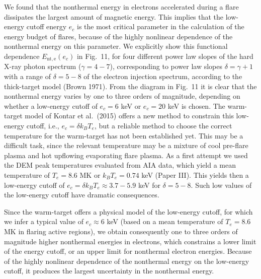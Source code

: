 \documentclass[10pt,preprint]{aastex}  %
\begin{document}
We found that the nonthermal energy in electrons accelerated during
a flare dissipates the largest amount of magnetic energy. This implies
that the low-energy cutoff energy $e_c$ is the most critical parameter
in the calculation of the energy budget of flares, because of the 
highly nonlinear dependence of the nonthermal energy on this
parameter. We explicitly show this functional dependence 
$E_{\mathrm{nt,e}}(e_c)$ in Fig.~11, for four different power law slopes
of the hard X-ray photon spectrum ($\gamma =4-7$), corresponding
to power law slopes $\delta=\gamma + 1$ with a range of 
$\delta = 5-8$ of the electron injection
spectrum, according to the thick-target model (Brown 1971).
From the diagram in Fig.~11 it is clear that the nonthermal energy 
varies by one to three orders of magnitude, depending on whether a 
low-energy cutoff of $e_c=6$ keV or $e_c=20$ keV is chosen.
The warm-target model of Kontar et al.~(2015) offers a new method
to constrain this low-energy cutoff, i.e., $e_c = \delta k_B T_e$,
but a reliable method to choose the correct temperature for the
warm-target has not been established yet. This may be a difficult
task, since the relevant temperature may be a mixture of cool
pre-flare plasma and hot upflowing evaporating flare plasma.
As a first attempt we used the DEM peak temperatures evaluated
from AIA data, which yield a mean temperature of $T_e=8.6$ MK
or $k_B T_e = 0.74$ keV (Paper III). This yields then a low-energy
cutoff of $e_c = \delta k_B T_e \approx 3.7-5.9$ keV for
$\delta = 5-8$. Such low values of the low-energy cutoff
have dramatic consequences.

Since the warm-target offers a physical model of the low-energy cutoff,
for which we infer a typical value of $e_c \approx
6$ keV (based on a mean temperature of $T_e=8.6$ MK in flaring 
active regions), we obtain consequently one to three orders of magnitude
higher nonthermal energies in electrons, which constrains 
a lower limit of the energy cutoff, or an upper limit for 
nonthermal electron energies. Because of the highly nonlinear 
dependence of the nonthermal energy on the low-energy cutoff, 
it produces the largest uncertainty in the nonthermal energy.
\end{document}
